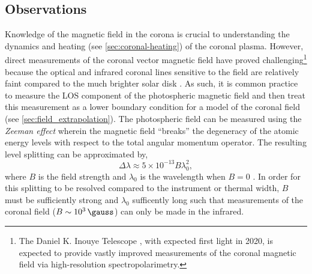 \subsection{Observations}\label{sec:magnetic-observations}

Knowledge of the magnetic field in the corona is crucial to understanding the dynamics and heating (see \autoref{sec:coronal-heating}) of the coronal plasma. However, direct measurements of the coronal vector magnetic field have proved challenging\footnote{The Daniel K. Inouye Telescope \citep{elmore_daniel_2014}, with expected first light in 2020, is expected to provide vastly improved measurements of the coronal magnetic field via high-resolution spectropolarimetry.} because the optical and infrared coronal lines sensitive to the field are relatively faint compared to the much brighter solar disk \citep{judge_coronal_2001}. As such, it is common practice to measure the LOS component of the photospheric magnetic field and then treat this measurement as a lower boundary condition for a model of the coronal field (see \autoref{sec:field_extrapolation}). The photospheric field can be measured using the \textit{Zeeman effect} wherein the magnetic field ``breaks'' the degeneracy of the atomic energy levels with respect to the total angular momentum operator. The resulting level splitting can be approximated by,
\begin{equation}\label{eq:zeeman}
    \Delta\lambda \approx 5\times10^{-13}B\lambda_0^2,
\end{equation}
where $B$ is the field strength and $\lambda_0$ is the wavelength when $B=0$ \citep{phillips_ultraviolet_2008}. In order for this splitting to be resolved compared to the instrument or thermal width, $B$ must be sufficiently strong and $\lambda_0$ sufficently long such that measurements of the coronal field ($B\sim\SI{e3}{\gauss}$) can only be made in the infrared.

